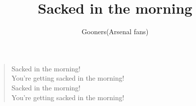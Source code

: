\documentclass[a4paper,12pt]{article}
\title{Sacked in the morning}
\author{Gooners(Arsenal fans)}
\date{}
\begin{document}
	
	\maketitle
	
	\begin{verse}
		
		Sacked in the morning! \\
		You're getting sacked in the morning! \\
		Sacked in the morning! \\
		You're getting sacked in the morning!
		
	\end{verse}
	
\end{document}
